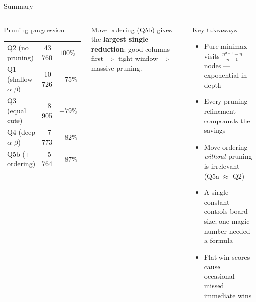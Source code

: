 \documentclass[aspectratio=1610]{beamer}
\begin{document}

\begin{frame}{Summary}
  \begin{columns}[T]
      \begin{block}{Pruning progression}
        \begin{tabular}{lrl}
          Q2 (no pruning)  & 43\,760 &  $100\%$ \\
          Q1 (shallow $\alpha$-$\beta$) & 10\,726 & $-75\%$ \\
          Q3 (equal cuts)             &  8\,905 & $-79\%$ \\
          Q4 (deep $\alpha$-$\beta$)  &  7\,773 & $-82\%$ \\
          Q5b (+ ordering) &  5\,764 & $-87\%$ \\
        \end{tabular}
      \end{block}
      \vspace{0.3em}
      Move ordering (Q5b) gives the \textbf{largest single reduction}:
      good columns first $\Rightarrow$ tight window $\Rightarrow$ massive pruning.
      \begin{exampleblock}{Key takeaways}
        \begin{itemize}
          \item Pure minimax visits $\frac{n^{d+1}-n}{n-1}$ nodes — exponential in depth
          \item Every pruning refinement compounds the savings
          \item Move ordering \emph{without} pruning is irrelevant (Q5a $\approx$ Q2)
          \item A single constant controls board size; one magic number needed a formula
          \item Flat win scores cause occasional missed immediate wins
        \end{itemize}
      \end{exampleblock}
  \end{columns}
\end{frame}

\end{document}
